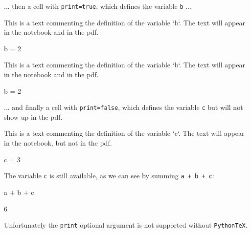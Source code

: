 \documentclass[oneside]{book}
\begin{document}
... then a cell with \texttt{print=true}, which defines the variable \texttt{b} ...

\ifPythonTeXLoaded
\begin{mdcell}[print=true]
This is a text commenting the definition of the variable `b`. The text will appear in the notebook and in the pdf.
\end{mdcell}
\begin{pycell}[print=true]
b = 2
\end{pycell}
\else
\begin{mdcell}
This is a text commenting the definition of the variable `b`. The text will appear in the notebook and in the pdf.
\end{mdcell}
\begin{pycell}
b = 2
\end{pycell}
\fi

... and finally a cell with \texttt{print=false}, which defines the variable \texttt{c} but will not show up in the pdf.

\ifPythonTeXLoaded
\begin{mdcell}[print=false]
This is a text commenting the definition of the variable `c`. The text will appear in the notebook, but not in the pdf.
\end{mdcell}
\begin{pycell}[print=false]
c = 3
\end{pycell}
\else
\fi

The variable \texttt{c} is still available, as we can see by summing \texttt{a + b + c}:
\begin{pycell}
a + b + c
\end{pycell}
\begin{pyexpectedoutput}
6
\end{pyexpectedoutput}

Unfortunately the \texttt{print} optional argument is not supported without \texttt{PythonTeX}.
\end{document}
